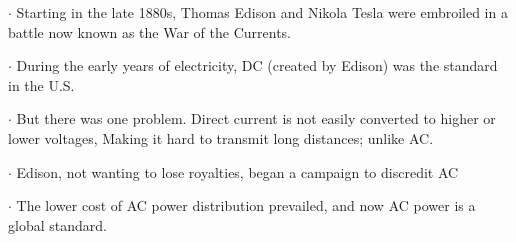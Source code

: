 \documentclass[preview]{standalone}
\begin{document}
\centering \begin{flushleft} $\cdot$ Starting in the late 1880s, Thomas Edison and Nikola Tesla were embroiled in a battle now known as the War of the Currents.\end{flushleft} \begin{flushleft} $\cdot$ During the early years of electricity, DC (created by Edison) was the standard in the U.S.\end{flushleft} \begin{flushleft} $\cdot$ But there was one problem. Direct current is not easily converted to higher or lower voltages, Making it hard to transmit long distances; unlike AC.\end{flushleft} \begin{flushleft} $\cdot$ Edison, not wanting to lose royalties, began a campaign to discredit AC\end{flushleft} \begin{flushleft} $\cdot$ The lower cost of AC power distribution prevailed, and now AC power is a global standard.\end{flushleft}
\end{document}
